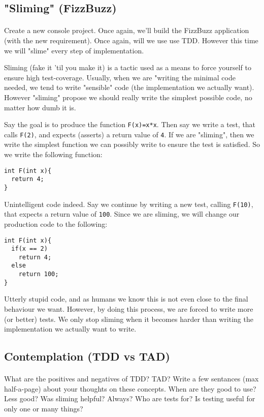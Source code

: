 \documentclass{article}
\begin{document}
  \subsection{ "Sliming" (FizzBuzz) }
    \paragraph{}
      Create a new console project. Once again, we'll build the FizzBuzz application (with the new requirement). Once again, will we use use TDD. However this time we will "slime" every step of implementation.

      Sliming (fake it 'til you make it) is a tactic used as a means to force yourself to ensure high test-coverage. Usually, when we are "writing the minimal code needed, we tend to write "sensible" code (the implementation we actually want). However "sliming" propose we should really write the simplest possible code, no matter how dumb it is.

      Say the goal is to produce the function \texttt{F(x)=x*x}. Then say we write a test, that calls \texttt{F(2)}, and expects (asserts) a return value of \texttt{4}. If we are "sliming", then we write the simplest function we can possibly write to ensure the test is satisfied. So we write the following function:

      \begin{lstlisting}
int F(int x){
  return 4;
}
      \end{lstlisting}

      Unintelligent code indeed. Say we continue by writing a new test, calling \texttt{F(10)}, that expects a return value of \texttt{100}. Since we are sliming, we will change our production code to the following:

      \begin{lstlisting}
int F(int x){
  if(x == 2)
    return 4;
  else
    return 100;
}
      \end{lstlisting}

      Utterly stupid code, and as humans we know this is not even close to the final behaviour we want. However, by doing this process, we are forced to write more (or better) tests. We only stop sliming when it becomes harder than writing the implementation we actually want to write.

  \subsection{ Contemplation (TDD vs TAD) }
    \paragraph{}
      What are the positives and negatives of TDD? TAD? Write a few sentances (max half-a-page) about your thoughts on these concepts. When are they good to use? Less good? Was sliming helpful? Always? Who are tests for? Is testing useful for only one or many things?
\end{document}
